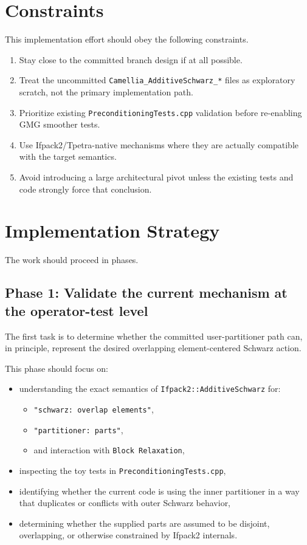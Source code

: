\documentclass[11pt]{article}
\begin{document}
\section{Constraints}
This implementation effort should obey the following constraints.
\begin{enumerate}[label=\arabic*.]
  \item Stay close to the committed branch design if at all possible.
  \item Treat the uncommitted \texttt{Camellia\_AdditiveSchwarz\_*} files as exploratory scratch, not the primary implementation path.
  \item Prioritize existing \texttt{PreconditioningTests.cpp} validation before re-enabling GMG smoother tests.
  \item Use Ifpack2/Tpetra-native mechanisms where they are actually compatible with the target semantics.
  \item Avoid introducing a large architectural pivot unless the existing tests and code strongly force that conclusion.
\end{enumerate}

\section{Implementation Strategy}
The work should proceed in phases.

\subsection{Phase 1: Validate the current mechanism at the operator-test level}
The first task is to determine whether the committed user-partitioner path can, in principle, represent the desired overlapping element-centered Schwarz action.

This phase should focus on:
\begin{itemize}
  \item understanding the exact semantics of \texttt{Ifpack2::AdditiveSchwarz} for:
  \begin{itemize}
    \item \texttt{"schwarz: overlap elements"},
    \item \texttt{"partitioner: parts"},
    \item and interaction with \texttt{Block Relaxation},
  \end{itemize}
  \item inspecting the toy tests in \texttt{PreconditioningTests.cpp},
  \item identifying whether the current code is using the inner partitioner in a way that duplicates or conflicts with outer Schwarz behavior,
  \item determining whether the supplied parts are assumed to be disjoint, overlapping, or otherwise constrained by Ifpack2 internals.
\end{itemize}
\end{document}
